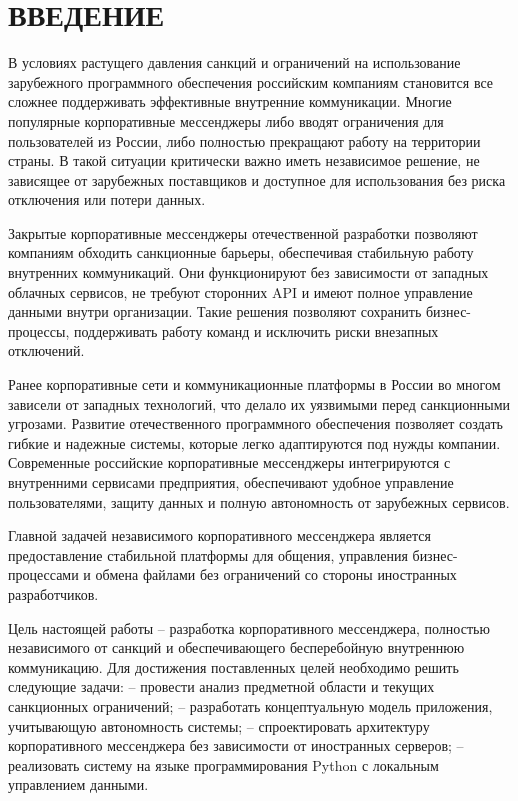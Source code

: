 \section*{ВВЕДЕНИЕ}

В условиях растущего давления санкций и ограничений на использование зарубежного программного обеспечения российским компаниям становится все сложнее поддерживать эффективные внутренние коммуникации. Многие популярные корпоративные мессенджеры либо вводят ограничения для пользователей из России, либо полностью прекращают работу на территории страны. В такой ситуации критически важно иметь независимое решение, не зависящее от зарубежных поставщиков и доступное для использования без риска отключения или потери данных.

Закрытые корпоративные мессенджеры отечественной разработки позволяют компаниям обходить санкционные барьеры, обеспечивая стабильную работу внутренних коммуникаций. Они функционируют без зависимости от западных облачных сервисов, не требуют сторонних API и имеют полное управление данными внутри организации. Такие решения позволяют сохранить бизнес-процессы, поддерживать работу команд и исключить риски внезапных отключений.

Ранее корпоративные сети и коммуникационные платформы в России во многом зависели от западных технологий, что делало их уязвимыми перед санкционными угрозами. Развитие отечественного программного обеспечения позволяет создать гибкие и надежные системы, которые легко адаптируются под нужды компании. Современные российские корпоративные мессенджеры интегрируются с внутренними сервисами предприятия, обеспечивают удобное управление пользователями, защиту данных и полную автономность от зарубежных сервисов.

Главной задачей независимого корпоративного мессенджера является предоставление стабильной платформы для общения, управления бизнес-процессами и обмена файлами без ограничений со стороны иностранных разработчиков.

Цель настоящей работы – разработка корпоративного мессенджера, полностью независимого от санкций и обеспечивающего бесперебойную внутреннюю коммуникацию. Для достижения поставленных целей необходимо решить следующие задачи: – провести анализ предметной области и текущих санкционных ограничений; – разработать концептуальную модель приложения, учитывающую автономность системы; – спроектировать архитектуру корпоративного мессенджера без зависимости от иностранных серверов; – реализовать систему на языке программирования Python с локальным управлением данными.